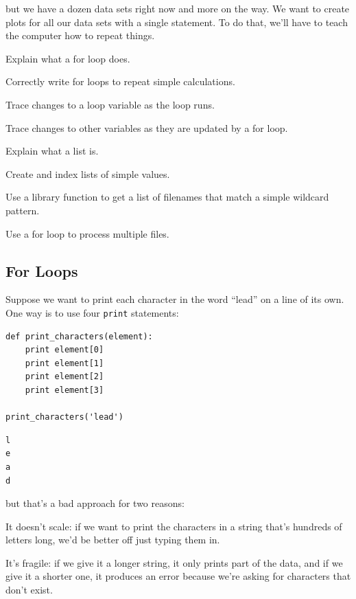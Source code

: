 \documentclass{book}
\begin{document}
but we have a dozen data sets right now and more on the way. We want to
create plots for all our data sets with a single statement. To do that,
we'll have to teach the computer how to repeat things.

\begin{objectives}
\begin{swcitemize}
\item
  Explain what a for loop does.
\item
  Correctly write for loops to repeat simple calculations.
\item
  Trace changes to a loop variable as the loop runs.
\item
  Trace changes to other variables as they are updated by a for loop.
\item
  Explain what a list is.
\item
  Create and index lists of simple values.
\item
  Use a library function to get a list of filenames that match a simple
  wildcard pattern.
\item
  Use a for loop to process multiple files.
\end{swcitemize}
\end{objectives}

\subsection{For Loops}

Suppose we want to print each character in the word ``lead'' on a line
of its own. One way is to use four \texttt{print} statements:

\begin{verbatim}
def print_characters(element):
    print element[0]
    print element[1]
    print element[2]
    print element[3]

print_characters('lead')
\end{verbatim}

\begin{verbatim}
l
e
a
d
\end{verbatim}

but that's a bad approach for two reasons:

\begin{swcenumerate}
\item
  It doesn't scale: if we want to print the characters in a string
  that's hundreds of letters long, we'd be better off just typing them
  in.
\item
  It's fragile: if we give it a longer string, it only prints part of
  the data, and if we give it a shorter one, it produces an error
  because we're asking for characters that don't exist.
\end{swcenumerate}
\end{document}

